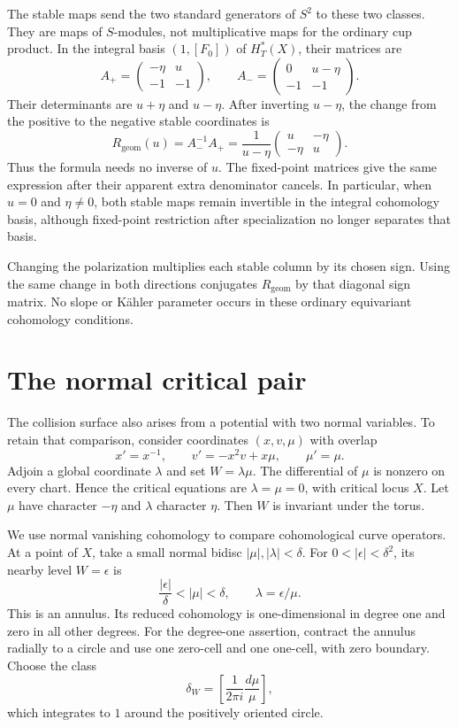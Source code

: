 The stable maps send the two standard generators of $S^2$ to these two classes.
They are maps of $S$-modules, not multiplicative maps for the ordinary cup product.
In the integral basis $(1,[F_0])$ of $H_T^*(X)$, their matrices are
\[
 A_+=\begin{pmatrix}-\eta&u\\-1&-1\end{pmatrix},\qquad
 A_-=\begin{pmatrix}0&u-\eta\\-1&-1\end{pmatrix}.
\]
Their determinants are $u+\eta$ and $u-\eta$.
After inverting $u-\eta$, the change from the positive to the negative stable coordinates is
\begin{equation}\label{eq:gi-geometric-r}
 R_{\mathrm{geom}}(u)=A_-^{-1}A_+
       =\frac1{u-\eta}\begin{pmatrix}u&-\eta\\-\eta&u\end{pmatrix}.
\end{equation}
Thus the formula needs no inverse of $u$.
The fixed-point matrices give the same expression after their apparent extra denominator cancels.
In particular, when $u=0$ and $\eta\ne0$, both stable maps remain invertible in the integral cohomology basis, although fixed-point restriction after specialization no longer separates that basis.

Changing the polarization multiplies each stable column by its chosen sign.
Using the same change in both directions conjugates $R_{\mathrm{geom}}$ by that diagonal sign matrix.
No slope or K\"ahler parameter occurs in these ordinary equivariant cohomology conditions.

\section{The normal critical pair}

The collision surface also arises from a potential with two normal variables.
To retain that comparison, consider coordinates $(x,v,\mu)$ with overlap
\[
 x'=x^{-1},\qquad v'=-x^2v+x\mu,\qquad \mu'=\mu.
\]
Adjoin a global coordinate $\lambda$ and set $W=\lambda\mu$.
The differential of $\mu$ is nonzero on every chart.
Hence the critical equations are $\lambda=\mu=0$, with critical locus $X$.
Let $\mu$ have character $-\eta$ and $\lambda$ character $\eta$.
Then $W$ is invariant under the torus.

We use normal vanishing cohomology to compare cohomological curve operators.
At a point of $X$, take a small normal bidisc $|\mu|,|\lambda|<\delta$.
For $0<|\epsilon|<\delta^2$, its nearby level $W=\epsilon$ is
\[
 \frac{|\epsilon|}{\delta}<|\mu|<\delta,\qquad
 \lambda=\epsilon/\mu.
\]
This is an annulus.
Its reduced cohomology is one-dimensional in degree one and zero in all other degrees.
For the degree-one assertion, contract the annulus radially to a circle and use one zero-cell and one one-cell, with zero boundary.
Choose the class
\[
 \delta_W=\left[\frac1{2\pi i}\frac{d\mu}{\mu}\right],
\]
which integrates to $1$ around the positively oriented circle.

